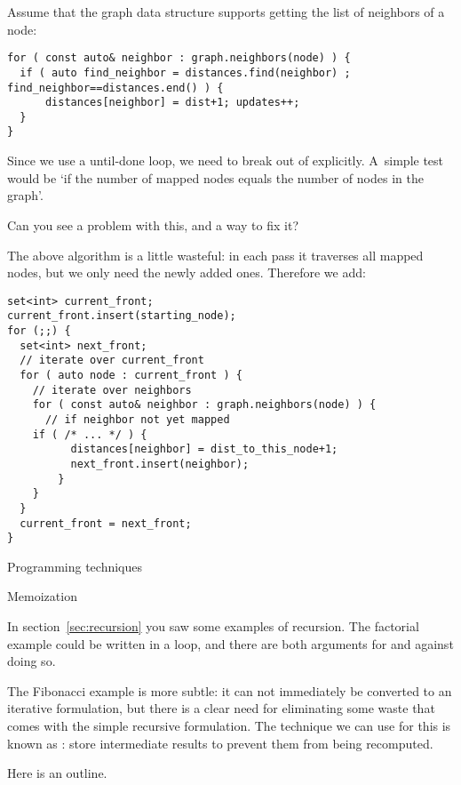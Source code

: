 Assume that the graph data structure supports
getting the list of neighbors of a node:
\begin{lstlisting}
for ( const auto& neighbor : graph.neighbors(node) ) {
  if ( auto find_neighbor = distances.find(neighbor) ; find_neighbor==distances.end() ) {
      distances[neighbor] = dist+1; updates++;
  }
}
\end{lstlisting}

Since we use a until-done loop, we need to break out of explicitly.
A~simple test would be `if the number of mapped nodes equals the number
of nodes in the graph'.

\begin{exercise}
  Can you see a problem with this, and a way to fix it?
\end{exercise}

The above algorithm is a little wasteful:
in each pass it traverses all mapped nodes,
but we only need the newly added ones.
Therefore we add:
\begin{lstlisting}
set<int> current_front;
current_front.insert(starting_node);
for (;;) {  
  set<int> next_front;
  // iterate over current_front
  for ( auto node : current_front ) {
    // iterate over neighbors
    for ( const auto& neighbor : graph.neighbors(node) ) {
      // if neighbor not yet mapped
	if ( /* ... */ ) {
          distances[neighbor] = dist_to_this_node+1;
          next_front.insert(neighbor);
        }
    }
  }
  current_front = next_front;
}
\end{lstlisting}

 {Programming techniques}

 {Memoization}
\label{sec:memo}

In section~\ref{sec:recursion} you saw some examples of recursion. The
factorial example could be written in a loop, and there are both arguments
for and against doing so. 

The Fibonacci example is more subtle: it can not immediately be
converted to an iterative formulation, but there is a clear need for
eliminating some waste that comes with the simple recursive
formulation. The technique we can use for this is known as
: store intermediate results to prevent them
from being recomputed.

Here is an outline.
